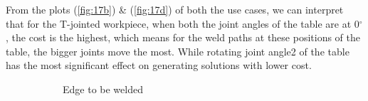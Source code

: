 From the plots (\ref{fig:17b}) \& (\ref{fig:17d}) of both the use cases, we can interpret that for the T-jointed workpiece, when both the joint angles of the table are at 0$^{\circ}$, the cost is the highest, which means for the weld paths at these positions of the table, the bigger joints move the most. While rotating  joint angle2 of the table has the most significant effect on generating solutions with lower cost. 
\clearpage

\begin{figure}[!ht] %
	\centering
	\begin{subfigure}[b]{0.4\textwidth}
		\caption{Edge to be welded}  
		\label{fig:18a}
	\end{subfigure}
	\begin{subfigure}[b]{0.4\textwidth}

\end{subfigure}
\end{figure}
